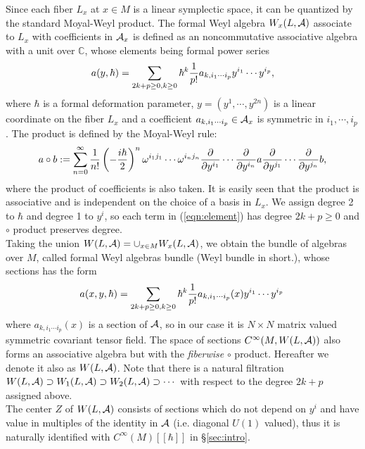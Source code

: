 \documentclass[10pt,a4paper]{article}
\def\h{\hbar}
\begin{document}
Since each fiber $L_x$ at $x\in M$ is a linear symplectic space, it can be quantized by the standard Moyal-Weyl product. The formal Weyl algebra $W_x(L,{\cal A})$ associate to $L_x$ with coefficients in ${\cal A}_x$ is defined as an noncommutative associative algebra with a unit over ${\mathbb C}$, whose elements being formal power series 
\begin{equation}
\label{eqn:element}
a(y,\h)=\sum_{2k+p\geq0,k\geq0}\h^k {1\over p!}a_{k,i_1\cdots i_p}y^{i_1}\cdots y^{i_p},
\end{equation}
where $\h$ is a formal deformation parameter, $y=(y^1,\cdots,y^{2n})$ is a linear coordinate on the fiber $L_x$ and a coefficient $a_{k,i_1\cdots i_p}\in{\cal A}_x$ is symmetric in $i_1,\cdots,i_p$. The product is defined by the Moyal-Weyl rule:
\begin{equation}
a\circ b:=\sum^\infty_{n=0}{1\over n!}\left(-{i\h\over2}\right)^n \omega^{i_1 j_1}\cdots\omega^{i_n j_n}{\partial\over\partial y^{i_1}}\cdots{\partial\over\partial y^{i_n}}a {\partial\over\partial y^{j_1}}\cdots{\partial\over\partial y^{j_n}}b,
\end{equation}
where the product of coefficients is also taken. It is easily seen that the product is associative and is independent on the choice of a basis in $L_x$. We assign degree 2 to $\h$ and degree 1 to $y^i$, so each term in (\ref{eqn:element}) has degree $2k+p\geq0$ and $\circ$ product preserves degree. \\

Taking the union $W(L,{\cal A})=\cup_{x\in M}W_x(L,{\cal A})$, we obtain the bundle of algebras over $M$, called formal Weyl algebras bundle (Weyl bundle in short.), whose sections has the form 
\begin{equation}
\label{eqn:section}
a(x,y,\h)=\sum_{2k+p\geq0,k\geq0}\h^k {1\over p!}a_{k,i_1\cdots i_p}(x)y^{i_1}\cdots y^{i_p} \,
\end{equation}
where $a_{k,i_1\cdots i_p}(x)$ is a section of ${\cal A}$, so in our case it is $N\times N$ matrix valued symmetric covariant tensor field. 
The space of sections $C^\infty(M,W(L,{\cal A}))$ also forms an associative algebra but with the {\it fiberwise} $\circ$ product. Hereafter we denote it also as  $W(L,{\cal  A})$. Note that there is a natural filtration $W(L,{\cal A})\supset W_1(L,{\cal A})\supset W_2(L,{\cal A})\supset\cdots$ with respect to the degree $2k+p$ assigned above.\\

The center $Z$ of $W(L,{\cal A})$ consists of sections which do not depend on $y^i$ and have value in multiples of the identity in ${\cal A}$ (i.e. diagonal $U(1)$ valued), thus it is naturally identified with $C^\infty(M)[[\h]]$ in \S\ref{sec:intro}. \\
\end{document}
